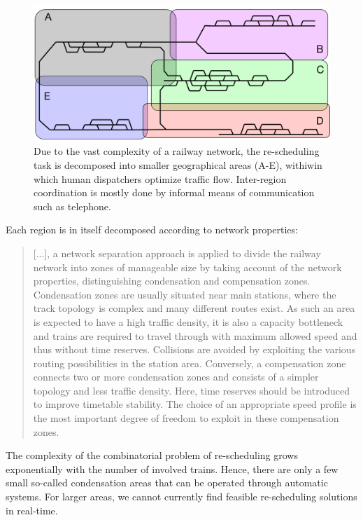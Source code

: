 \documentclass{article}
\begin{document}
%
\begin{figure}[hbtp]
	\centering
  \includegraphics[width=\textwidth]{Figures/disposition_areas.pdf}
	\caption{Due to the vast complexity of a railway network, the re-scheduling task is decomposed into smaller geographical areas (A-E), withiwin which human dispatchers optimize traffic flow. Inter-region coordination is mostly done by informal means of communication such as telephone.}
	\label{fig:geographical_decomposition}
\end{figure}
%

Each region is in itself decomposed according to network properties:

%
\begin{quote}
    [...], a network separation approach is applied to divide the railway network into zones of manageable size by taking account of the network properties, distinguishing condensation and compensation zones. Condensation zones are usually situated near main stations, where the track topology is complex and many different routes exist. As such an area is expected to have a high traffic density, it is also a capacity bottleneck and trains are required to travel through with maximum allowed speed and thus without time reserves. Collisions are avoided by exploiting the various routing possibilities in the station area. Conversely, a compensation zone connects two or more condensation zones and consists of a simpler topology and less traffic density. Here, time reserves should be introduced to improve timetable stability. The choice of an appropriate speed profile is the most important degree of freedom to exploit in these compensation zones. \cite{caimi2009}
\end{quote}

 The complexity of the combinatorial problem of re-scheduling grows exponentially with the number of involved trains. Hence, there are only a few small so-called condensation areas \cite{caimi2009} that can be operated through automatic systems. For larger areas, we cannot currently find feasible re-scheduling solutions in real-time.
\end{document}
